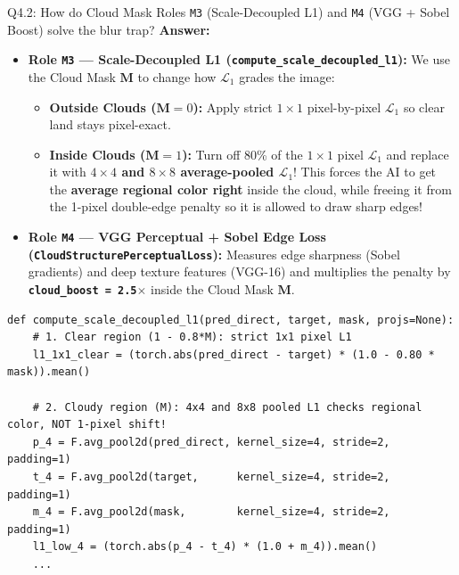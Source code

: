 \documentclass[11pt,a4paper]{article}
\begin{document}
\begin{qbox}{Q4.2: How do Cloud Mask Roles \texttt{M3} (Scale-Decoupled L1) and \texttt{M4} (VGG + Sobel Boost) solve the blur trap?}
\textbf{Answer:}
\begin{itemize}[leftmargin=18pt]
    \item \textbf{Role \texttt{M3} — Scale-Decoupled L1 (\texttt{compute\_scale\_decoupled\_l1}):}
    We use the Cloud Mask $\mathbf{M}$ to change how $\mathcal{L}_1$ grades the image:
    \begin{itemize}
        \item \textbf{Outside Clouds ($\mathbf{M}=0$):} Apply strict $1\times 1$ pixel-by-pixel $\mathcal{L}_1$ so clear land stays pixel-exact.
        \item \textbf{Inside Clouds ($\mathbf{M}=1$):} Turn off 80\% of the $1\times 1$ pixel $\mathcal{L}_1$ and replace it with \textbf{$4\times 4$ and $8\times 8$ average-pooled $\mathcal{L}_1$}! This forces the AI to get the \textbf{average regional color right} inside the cloud, while freeing it from the 1-pixel double-edge penalty so it is allowed to draw sharp edges!
    \end{itemize}
    \item \textbf{Role \texttt{M4} — VGG Perceptual + Sobel Edge Loss (\texttt{CloudStructurePerceptualLoss}):}
    Measures edge sharpness (Sobel gradients) and deep texture features (VGG-16) and multiplies the penalty by \textbf{\texttt{cloud\_boost = 2.5$\times$}} inside the Cloud Mask $\mathbf{M}$.
\end{itemize}

\begin{lstlisting}[caption={Scale-Decoupled L1 Loss Using Cloud Mask Role M3 (from \texttt{backend/losses/patchgan\_loss.py})}]
def compute_scale_decoupled_l1(pred_direct, target, mask, projs=None):
    # 1. Clear region (1 - 0.8*M): strict 1x1 pixel L1
    l1_1x1_clear = (torch.abs(pred_direct - target) * (1.0 - 0.80 * mask)).mean()

    # 2. Cloudy region (M): 4x4 and 8x8 pooled L1 checks regional color, NOT 1-pixel shift!
    p_4 = F.avg_pool2d(pred_direct, kernel_size=4, stride=2, padding=1)
    t_4 = F.avg_pool2d(target,      kernel_size=4, stride=2, padding=1)
    m_4 = F.avg_pool2d(mask,        kernel_size=4, stride=2, padding=1)
    l1_low_4 = (torch.abs(p_4 - t_4) * (1.0 + m_4)).mean()
    ...
\end{lstlisting}
\end{qbox}
\end{document}
